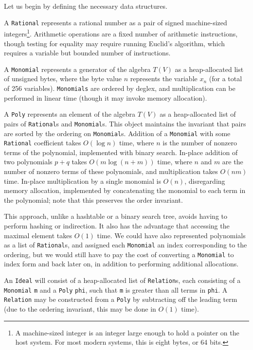 Let us begin by defining the necessary data structures.

\begin{defn}
    A \verb|Rational| represents a rational number as a pair of signed machine-sized 
    integers\footnote{A machine-sized integer is an integer large enough to hold a pointer on
    the host system. For most modern systems, this is eight bytes, or 64 bits.}. Arithmetic
    operations are a fixed number of arithmetic instructions, though testing for equality
    may require running Euclid's algorithm, which requires a variable but bounded number 
    of instructions.
    
    A \verb|Monomial| represents a generator of the algebra $T(V)$ as a heap-allocated
    list of unsigned bytes, where the byte value $n$ represents the variable $x_n$ 
    (for a total of 256 variables). \verb|Monomials| are ordered by deglex,
    and multiplication can be performed in linear time (though it may invoke memory
    allocation).

    A \verb|Poly| represents an element of the algebra $T(V)$ as a heap-allocated
    list of pairs of \verb|Rational|s and \verb|Monomial|s. This object maintains the
    invariant that pairs are sorted by the ordering on \verb|Monomial|s. Addition
    of a \verb|Monomial| with some \verb|Rational| coefficient takes $O(\log n)$ time,
    where $n$ is the number of nonzero terms of the polynomial, implemented with binary
    search. In-place addition of two polynomials $p + q$ takes $O(m\log (n+m))$ time, 
    where $n$ and $m$ are the number of nonzero terms of these polynomials, and
    multiplication takes $O(nm)$ time. In-place multiplication by a single monomial
    is $O(n)$, disregarding memory allocation, implemented by concatenating the monomial
    to each term in the polynomial; note that this preserves the order invariant.
    
    This approach, unlike a hashtable or a binary
    search tree, avoids having to perform hashing or indirection. It also has the
    advantage that accessing the maximal element takes $O(1)$ time. We could have
    also represented polynomials as a list of \verb|Rational|s, and assigned each
    \verb|Monomial| an index corresponding to the ordering, but we would still have to pay
    the cost of converting a \verb|Monomial| to index form and back later on, in addition
    to performing additional allocations.
    
    An \verb|Ideal| will consist of a heap-allocated list of \verb|Relation|s,
    each consisting of a \verb|Monomial| \verb|m| and a \verb|Poly| \verb|phi|, 
    such that \verb|m| is greater than all terms in \verb|phi|. A \verb|Relation|
    may be constructed from a \verb|Poly| by subtracting off the leading term (due
    to the ordering invariant, this may be done in $O(1)$ time).
\end{defn}

